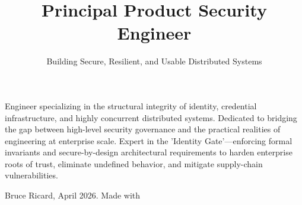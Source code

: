 \documentclass{curve}
\title{Principal Product Security Engineer}
\subtitle{Building Secure, Resilient, and Usable Distributed Systems}
\begin{document}
\makeheaders[t]
\maketitle

\begin{center}
  \parbox{0.95\textwidth}{ \small Engineer specializing in the
    structural integrity of identity, credential infrastructure, and
    highly concurrent distributed systems. Dedicated to bridging the
    gap between high-level security governance and the practical
    realities of engineering at enterprise scale. Expert in the
    'Identity Gate'—enforcing formal invariants and secure-by-design
    architectural requirements to harden enterprise roots of trust,
    eliminate undefined behavior, and mitigate supply-chain
    vulnerabilities.  }
\end{center}

\vspace{1em}
\newpage
\makeheaders[t]


\vfill
\begin{center}
\tiny Bruce Ricard, April 2026. Made with \LaTeXe
\end{center}
\end{document}
